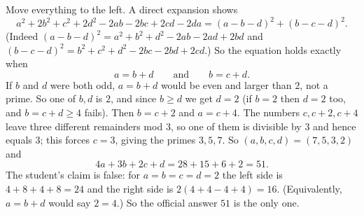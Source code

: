Move everything to the left. A direct expansion shows
\[
a^2+2b^2+c^2+2d^2-2ab-2bc+2cd-2da=(a-b-d)^2+(b-c-d)^2 .
\]
(Indeed $(a-b-d)^2=a^2+b^2+d^2-2ab-2ad+2bd$ and $(b-c-d)^2=b^2+c^2+d^2-2bc-2bd+2cd$.) So the equation holds exactly when
\[
a=b+d\qquad\text{and}\qquad b=c+d .
\]
If $b$ and $d$ were both odd, $a=b+d$ would be even and larger than $2$, not a prime. So one of $b,d$ is $2$, and since $b\ge d$ we get $d=2$ (if $b=2$ then $d=2$ too, and $b=c+d\ge4$ fails). Then $b=c+2$ and $a=c+4$. The numbers $c,c+2,c+4$ leave three different remainders mod $3$, so one of them is divisible by $3$ and hence equals $3$; this forces $c=3$, giving the primes $3,5,7$. So $(a,b,c,d)=(7,5,3,2)$ and
\[
4a+3b+2c+d=28+15+6+2=\boxed{51}.
\]
The student's claim is false: for $a=b=c=d=2$ the left side is $4+8+4+8=24$ and the right side is $2(4+4-4+4)=16$. (Equivalently, $a=b+d$ would say $2=4$.) So the official answer $51$ is the only one.
